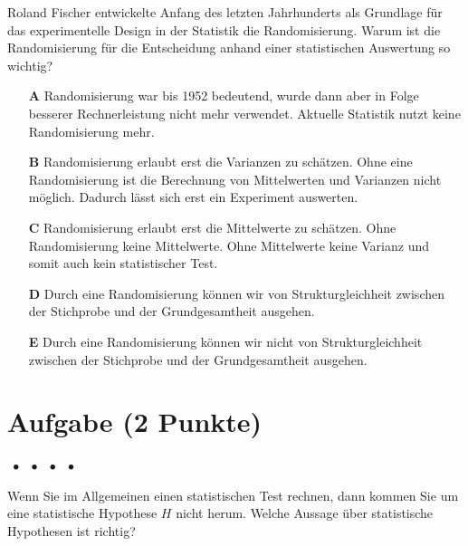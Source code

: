 \documentclass[a4paper, 9pt]{scrartcl}\usepackage[]{graphicx}\usepackage[]{xcolor}
\begin{document}
Roland Fischer entwickelte Anfang des letzten Jahrhunderts als Grundlage für das experimentelle Design in der Statistik die Randomisierung. Warum ist die Randomisierung für die Entscheidung anhand einer statistischen Auswertung so wichtig?



\begin{enumerate}
\item [\textbf{A} \msquare] Randomisierung war bis 1952 bedeutend, wurde dann aber in Folge besserer Rechnerleistung nicht mehr verwendet. Aktuelle Statistik nutzt keine Randomisierung mehr.
\item [\textbf{B} \msquare] Randomisierung erlaubt erst die Varianzen zu schätzen. Ohne eine Randomisierung ist die Berechnung von Mittelwerten und Varianzen nicht möglich. Dadurch lässt sich erst ein Experiment auswerten.
\item [\textbf{C} \msquare] Randomisierung erlaubt erst die Mittelwerte zu schätzen. Ohne Randomisierung keine Mittelwerte. Ohne Mittelwerte keine Varianz und somit auch kein statistischer Test.
\item [\textbf{D} \msquare] Durch eine Randomisierung können wir von Strukturgleichheit zwischen der Stichprobe und der Grundgesamtheit ausgehen.
\item [\textbf{E} \msquare] Durch eine Randomisierung können wir nicht von Strukturgleichheit zwischen der Stichprobe und der Grundgesamtheit ausgehen.
\end{enumerate}

\section{Aufgabe \hfill (2 Punkte)}

\ifcollection
\begin{flushright}
\tiny\vspace{-2Ex}
\textbf{\examinhaltstart}
\exammodulemathstat $\;\bullet$
\exammodulestat $\;\bullet$
\exammodulestatbbv $\;\bullet$
\exammodulestatversuch $\;\bullet$
\exammodulebiostat
\vspace{-1Ex}
\end{flushright}
\fi




Wenn Sie im Allgemeinen einen statistischen Test rechnen, dann kommen Sie um eine statistische Hypothese $H$ nicht herum. Welche Aussage über statistische Hypothesen ist richtig?
\end{document}
